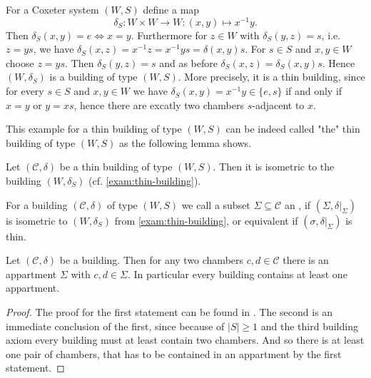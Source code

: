 \begin{exam}
	For a Coxeter system $(W,S)$ define a map
	$$ \delta_S : W \times W \to W : (x,y) \mapsto x^{-1}y. $$
	Then $\delta_S(x,y) = e \iff x = y$. Furthermore for $z \in W$ with $\delta_S(y,z) = s$, i.e. $z = ys$, we have $\delta_S(x,z) = x^{-1}z = x^{-1}ys = \delta(x,y)s$. For $s \in S$ and $x,y \in W$ choose $z = ys$. Then $\delta_S(y,z) = s$ and as before $\delta_S(x,z) = \delta_S(x,y)s$. Hence $(W,\delta_S)$ is a building of type $(W,S)$. More precisely, it is a thin building, since for every $s \in S$ and $x,y \in W$ we have $\delta_S(x,y) = x^{-1}y \in \{e,s\}$ if and only if $x = y$ or $y = xs$, hence there are excatly two chambers $s$-adjacent to $x$.
\end{exam}

This example for a thin building of type $(W,S)$ can be indeed called "the" thin building of type $(W,S)$ as the following lemma shows.

\begin{lemm}
	Let $(\mathcal{C}, \delta)$ be a thin building of type $(W,S)$. Then it is isometric to the building $(W, \delta_S)$ (cf. \ref{exam:thin-building}).
\end{lemm}

\begin{defi}
	For a building $(\mathcal{C},\delta)$ of type $(W,S)$ we call a subset $\Sigma \subseteq \mathcal{C}$ an , if $(\Sigma, \delta|_\Sigma)$ is isometric to $(W,\delta_S)$ from \ref{exam:thin-building}, or equivalent if $(\sigma, \delta|_\Sigma)$ is thin.
\end{defi}

\begin{theo}
	Let $(\mathcal{C},\delta)$ be a building. Then for any two chambers $c,d \in \mathcal{C}$ there is an appartment $\Sigma$ with $c,d \in \Sigma$. In particular every building contains at least one appartment.

	\begin{proof}
		The proof for the first statement can be found in \cite[Theorem 11.2.5]{buekenhout:diagram-geometry}. The second is an immediate conclusion of the first, since because of $|S| \geq 1$ and the third building axiom every building must at least contain two chambers. And so there is at least one pair of chambers, that has to be contained in an appartment by the first statement.
	\end{proof}
\end{theo}

